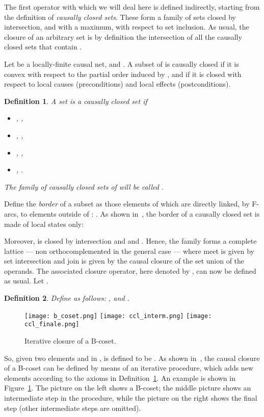\documentclass{eptcs}
\newtheorem{definition}{Definition}
\begin{document}
The first operator with which we will deal here is defined
indirectly, starting from the
definition of \emph{causally closed sets}. These form a family of sets
closed by intersection, and with a maximum, with respect to set
inclusion. As usual, the closure of an arbitrary set
 is by definition
the intersection of all the causally closed sets that contain .

Let  be a locally-finite causal net,
and .
A subset of  is causally closed if it is convex with respect to the
partial order induced by , and if it is closed with respect
to local causes (preconditions) and local effects (postconditions).
\begin{definition} \label{d:sottoinsiemi_causalmente_chiusi}
A set  is a \emph{causally closed set} if
\begin{itemize}
\item [\emph{(i)}] , ,
\item [\emph{(ii)}] , ,
\item [\emph{(iii)}] , ,
\item [\emph{(iv)}] , .
\end{itemize}
The family of causally closed sets of  will be called .
\end{definition}
Define the \emph{border} of a subset  as those
elements of  which are directly linked, by F-arcs, to elements outside
of :
.
As shown in~\cite{BPR10}, the border of a causally closed set is
made of local states only:

Moreover,  is closed by
intersection and  and .
Hence, the family   forms a complete lattice --- non
orthocomplemented in the general case --- where meet is given by set
intersection and join is given by the causal closure of
the set union of the operands.
The associated closure operator, here denoted by ,
can now be defined as usual.
Let .
\begin{definition}\label{d:costruzione_sottoinsiemi_causalmente_chiusi}
Define  as follows:
,
 and .
\end{definition}
\begin{figure}
  \begin{center}
\texttt{[image: b\_coset.png]}
\quad
\texttt{[image: ccl\_interm.png]}
\quad
\texttt{[image: ccl\_finale.png]}
  \end{center}
  \caption{Iterative closure of a B-coset.}\label{f:it_clos}
\end{figure}
So, given two elements  and  in ,  is defined
to be .
As shown in~\cite{BPR10}, the causal closure of a B-coset can be
defined by means of an iterative procedure, which adds new
elements according to the axioms in
Definition~\ref{d:sottoinsiemi_causalmente_chiusi}.
An example is shown in Figure~\ref{f:it_clos}.
The picture on the left shows a B-coset; the middle picture
shows an intermediate step in the procedure, while the picture
on the right shows the final step (other intermediate steps
are omitted).
\end{document}
